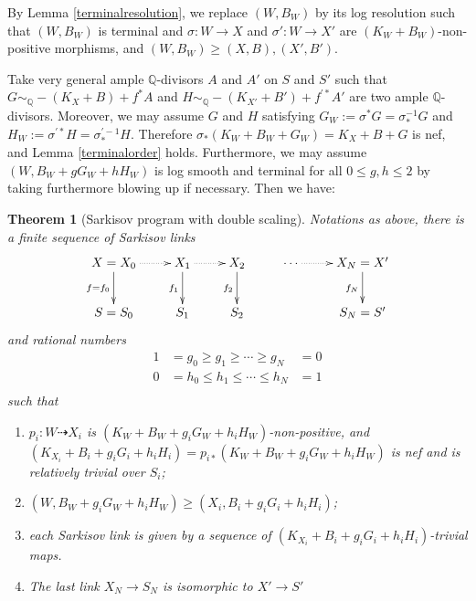 \documentclass{article}
\newtheorem{thm}[defn]{Theorem}
\begin{document}
By Lemma \ref{terminalresolution}, we  replace $(W,B_W)$ by its log resolution such that $(W,B_{W})$ is terminal and $\sigma:W\to X$ and $\sigma':W\to X'$ are $(K_W+B_W)$-non-positive morphisms, and $(W,B_W)\geqslant (X,B),(X',B')$. 

Take  very general ample $\mathbb{Q}$-divisors $ A $ and $ A' $ on $ S $ and $ S' $ such that $ G\sim_{\mathbb{Q}}-(K_X+B)+f^*A $ and $ H\sim_{\mathbb{Q}}-(K_{X'}+B')+f^{'*}A' $ are two ample $\mathbb{Q}$-divisors. Moreover, we may assume $ G $ and $ H $ satisfying $G_{W}:= \sigma^*G=\sigma^{-1}_*G $ and $ H_{W}:=\sigma^{'*}H=\sigma^{'-1}_*H $. Therefore $\sigma_{*}(K_{W}+B_{W}+G_{W})=K_{X}+B+G$ is nef, and Lemma \ref{terminalorder} holds.
Furthermore, we may assume $(W,B_W+gG_W+hH_W)$ is log smooth and terminal for all $0\leqslant g,h\leqslant 2$ by taking furthermore blowing up if necessary.
Then we have:
\begin{thm}[Sarkisov program with double scaling]\label{main2}
Notations as above, there is a finite sequence of Sarkisov links
\[
  \xymatrix{
    X=X_0\ar@{.>}[r]\ar[d]_{f=f_{0}}&X_{1}\ar@{.>}[r]\ar[d]_{f_{1}}& X_{2}\ar[d]_{f_{2}} &\cdots\ar@{.>}[r]&X_N=X'\ar[d]_{f_{N}} \\
    S=S_{0}&S_{1} &S_{2}&&S_N=S'
  }
\]
and rational numbers
\[
  \begin{aligned}
    1&=g_0\geqslant g_1 \geqslant \cdots \geqslant g_N&=0\\
    0&=h_0\leqslant h_{1} \leqslant \cdots \leqslant h_N&=1\\
  \end{aligned}
\]
such that 
\begin{enumerate}
  \item $p_i:W\dashrightarrow  X_{i}$ is $(K_{W}+B_{W}+g_{i}G_{W}+h_{i}H_{W})$-non-positive, and $(K_{X_{i}}+B_{i}+g_{i}G_{i}+h_{i}H_{i})=p_{i*}(K_{W}+B_{W}+g_{i}G_{W}+h_{i}H_{W})$ is nef and is relatively trivial over $S_{i}$;
  \item $(W,B_{W}+g_{i}G_{W}+h_{i}H_{W})\geqslant (X_{i},B_{i}+g_{i}G_{i}+h_{i}H_{i})$;
  \item each Sarkisov link is given by a sequence of $(K_{X_{i}}+B_{i}+g_{i}G_{i}+h_{i}H_{i})$-trivial maps.
    \item  The last link $X_{N} \to S_{N}$ is isomorphic to $X'\to S'$
\end{enumerate}
\end{thm}
\end{document}
